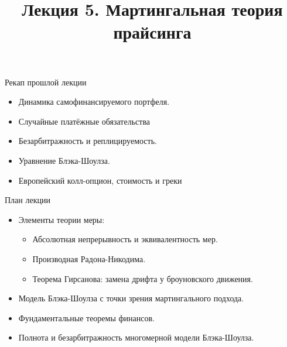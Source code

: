 \documentclass[aspectratio=169]{beamer}
\title[Мартингальная теория прайсинга]{Лекция 5. Мартингальная теория прайсинга} %
\begin{document}
\begin{frame}
\titlepage 
\end{frame}

\begin{frame}{Рекап прошлой лекции} 
\begin{itemize} 
    \item Динамика самофинансируемого портфеля.
    \item Случайные платёжные обязательства
    \item Безарбитражность и реплицируемость.
    \item Уравнение Блэка-Шоулза.
    \item Европейский колл-опцион, стоимость и греки
\end{itemize}
\end{frame}

\begin{frame}{План лекции}
    \begin{itemize}
        \item Элементы теории меры:
        \begin{itemize}
            \item Абсолютная непрерывность и эквивалентность мер.
            \item Производная Радона-Никодима.
            \item Теорема Гирсанова: замена дрифта у броуновского движения.
        \end{itemize}
        \item Модель Блэка-Шоулза с точки зрения мартингального подхода.
        \item Фундаментальные теоремы финансов.
        \item Полнота и безарбитражность многомерной модели Блэка-Шоулза. 
    \end{itemize}
\end{frame}
\end{document}
